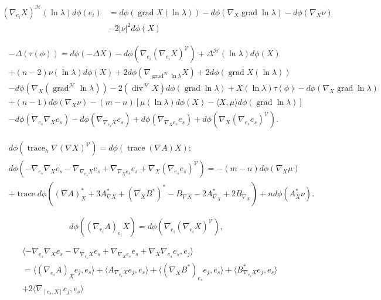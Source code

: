 \documentclass[12pt]{article}
\begin{document}
\begin{align*}
(\nabla_{e_{i}}X)^{\mathcal{H}} (\ln\lambda)d\phi(e_{i}) &=  d\phi( \operatorname{grad}  X (\ln\lambda ) ) - d\phi(\nabla_{X} \operatorname{grad} \ln\lambda)- d\phi(\nabla_{X}\nu) \\
&- 2|\nu|^2 d\phi(X)
\end{align*}

\begin{align*}
&-\Delta (\tau(\phi)) =  d\phi(-\Delta X) - d\phi(\nabla_{e_{i}}(\nabla_{e_{i}}X)^{\mathcal{V}})
+ \Delta^{\mathcal{H}} (\ln\lambda) d\phi(X) \\
&+ (n-2) \nu(\ln\lambda)d\phi(X) 
 + 2 d\phi(\nabla_{\operatorname{grad}^{\mathcal{H}} \ln\lambda} X) + 2d\phi(\operatorname{grad} X(\ln\lambda)) \\
&-d\phi(\nabla_{X} (\operatorname{grad}^{\mathcal{H}}\ln\lambda)) -2 (\operatorname{div}^{\mathcal{H}} X) d\phi(\operatorname{grad} \ln\lambda)
+ X(\ln \lambda)\tau(\phi) - d\phi (\nabla_{X} \operatorname{grad} \ln\lambda) \\
& + (n-1) d\phi(\nabla_{X} \nu)  - (m-n)[ \mu(\ln\lambda) d\phi(X) - \langle X, \mu \rangle d\phi(\operatorname{grad}\ln\lambda)] \\
& - d\phi(\nabla_{e_{s}}\nabla_{X} e_{s}) - d\phi(\nabla_{\nabla_{e_{s}}X}e_{s}) +
d\phi(\nabla_{\nabla_{X}e_{s}}e_{s})+ d\phi (\nabla_{X}(\nabla_{e_{s}}e_{s})^{\mathcal{V}} ).
\end{align*}

\begin{align*}
&d\phi(\operatorname{trace}_{h} \nabla (\nabla X)^{\mathcal{V}}) = d\phi(\operatorname{trace} (\nabla A)X) ;\\
&d\phi(-\nabla_{e_{s}}\nabla_{X} e_{s} - \nabla_{\nabla_{e_{s}}X}e_{s}
+ \nabla_{\nabla_{X}e_{s}}e_{s} + \nabla_{X}(\nabla_{e_{s}}e_{s})^{\mathcal{V}}) = -(m-n)d\phi(\nabla_{X}\mu) \\
&+ \operatorname{trace} d\phi( (\nabla A)^{*}_{X} + 3 A^{*}_{\nabla X} + (\nabla_{X} B^{*})^{*} -
B_{\nabla X} -2A^{*}_{\nabla_{X}}  + 2 B_{\nabla_{X}}) + n d\phi(A^{*}_{X}\nu).
\end{align*}

$$ d\phi((\nabla_{e_{i}}A )_{e_{i}} X) =  d\phi(\nabla_{e_{i}} (\nabla_{e_{i}} X)^{\mathcal{V}} ),$$

\begin{align*}
&\langle -\nabla_{e_{s}}\nabla_{X} e_{s} - \nabla_{\nabla_{e_{s}}X}e_{s}
+ \nabla_{\nabla_{X}e_{s}}e_{s} + \nabla_{X}\nabla_{e_{s}}e_{s}, e_{j}\rangle  \\
&= \langle (\nabla_{e_{s}}A)_{X} e_{j}, e_{s}\rangle  + \langle A_{\nabla_{e_{s}} X}
e_{j}, e_{s}\rangle + \langle (\nabla_{X}B^{*})_{e_{s}} e_{j}, e_{s}\rangle + \langle
B^{*}_{\nabla_{e_{s}}X} e_{j}, e_{s}\rangle \\
&+ 2 \langle \nabla_{[e_{s},X]} e_{j} ,e_{s} \rangle
\end{align*}
\end{document}
